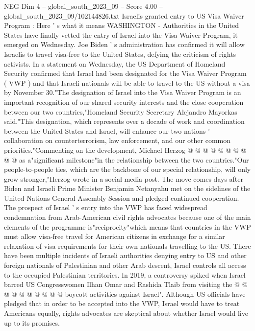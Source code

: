 \begin{textsample}{NEG Dim 4 – global\_south\_2023\_09 – Score 4.00 – global\_south\_2023\_09/102144826.txt}  \label{ex:f4_neg_027}
Israelis granted entry to US Visa Waiver Program : Here ' s what it means WASHINGTON - Authorities in the United States have finally vetted the entry of Israel into the Visa Waiver Program, it emerged on Wednesday.
Joe Biden ' s administration has confirmed it will allow Israelis to travel visa-free to the United States, defying the criticism of rights activists.
In a statement on Wednesday, the US Department of Homeland Security confirmed that Israel had been designated for the Visa Waiver Program ( VWP ) and that Israeli nationals will be able to travel to the US without a visa by November 30."The designation of Israel into the Visa Waiver Program is an important recognition of our shared security interests and the close cooperation between our two countries,"Homeland Security Secretary Alejandro Mayorkas said."This designation, which represents over a decade of work and coordination between the United States and Israel, will enhance our two nations ' collaboration on counterterrorism, law enforcement, and our other common priorities."Commenting on the development, Michael Herzog @ @ @ @ @ @ @ @ @ @ as a"significant milestone"in the relationship between the two countries."Our people-to-people ties, which are the backbone of our special relationship, will only grow stronger,"Herzog wrote in a social media post.
The move comes days after Biden and Israeli Prime Minister Benjamin Netanyahu met on the sidelines of the United Nations General Assembly Session and pledged continued cooperation.
The prospect of Israel ' s entry into the VWP has faced widespread condemnation from Arab-American civil rights advocates because one of the main elements of the programme is"reciprocity"which means that countries in the VWP must allow visa-free travel for American citizens in exchange for a similar relaxation of visa requirements for their own nationals travelling to the US.
There have been multiple incidents of Israeli authorities denying entry to US and other foreign nationals of Palestinian and other Arab descent, Israel controls all access to the occupied Palestinian territories.
In 2019, a controversy spiked when Israel barred US Congresswomen Ilhan Omar and Rashida Tlaib from visiting the @ @ @ @ @ @ @ @ @ @ boycott activities against Israel".
Although US officials have pledged that in order to be accepted into the VWP, Israel would have to treat Americans equally, rights advocates are skeptical about whether Israel would live up to its promises.

\end{textsample}
